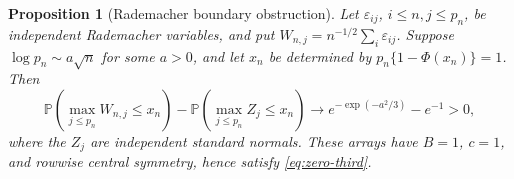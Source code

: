 \documentclass[11pt,a4paper]{article}
\newtheorem{proposition}{Proposition}
\theoremstyle{remark}
\newcommand{\Pp}{\mathbb P}
\begin{document}
\begin{proposition}[Rademacher boundary obstruction]
\label{zs:rademacher-boundary}
Let \(\varepsilon_{ij}\), \(i\le n,j\le p_n\), be independent
Rademacher variables, and put
\(W_{n,j}=n^{-1/2}\sum_i\varepsilon_{ij}\).
Suppose \(\log p_n\sim a\sqrt n\) for some \(a>0\), and let
\(x_n\) be determined by \(p_n\{1-\Phi(x_n)\}=1\). Then
\begin{equation}
 \Pp\!\left(\max_{j\le p_n}W_{n,j}\le x_n\right)
 -\Pp\!\left(\max_{j\le p_n}Z_j\le x_n\right)
 \longrightarrow e^{-\exp(-a^2/3)}-e^{-1}>0,
 \label{zs:boundary-limit}
\end{equation}
where the \(Z_j\) are independent standard normals. These arrays have
\(B=1\), \(c=1\), and rowwise central symmetry, hence satisfy
\eqref{eq:zero-third}.
\end{proposition}
\end{document}
